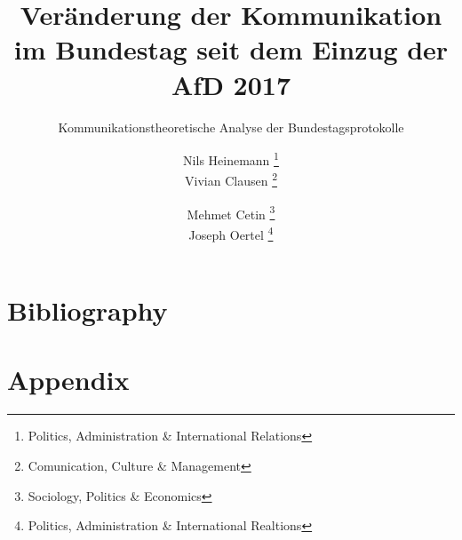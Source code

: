 \documentclass[12pt, letterpaper]{article}
\title{Veränderung der Kommunikation im Bundestag seit dem Einzug der AfD 2017}
\subtitle{Kommunikationstheoretische Analyse der Bundestagsprotokolle}
\author{Nils Heinemann \thanks{Politics, Administration \& International Relations}  \\[3ex] Vivian Clausen \thanks{Comunication, Culture \& Management} \and Mehmet Cetin \thanks{Sociology, Politics \& Economics} \\[3ex] Joseph Oertel \thanks{Politics, Administration \& International Realtions}\\[3ex]}
\begin{document}
	
	\maketitle
	\doublespacing
	

	
	\clearpage
	
	\newpage
	
	
		
	
	
	
	
	
	\newpage
	
	\section{Bibliography}
	
	\newpage
	
	\section{Appendix}
	
	\listoftables
	\listoffigures
	
	
\end{document}
